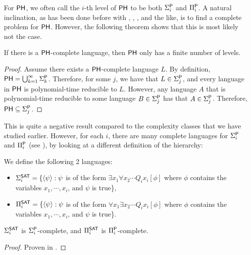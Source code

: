 For $\PH$, we often call the $i$-th level of $\PH$ to be both $\Sigma_i^\P$ and $\Pi_i^\P$. A natural inclination, as has been done before with \NP, \PSPACE, \NL, and the like, is to find a complete problem for $\PH$. However, the following theorem shows that this is most likely not the case.

\begin{theorem}
If there is a $\PH$-complete language, then $\PH$ only has a finite number of levels.
\end{theorem}

\begin{proof}
Assume there exists a $\PH$-complete language $L$. By definition, $\PH = \bigcup_{k = 1}^{\infty} \Sigma_k^\P$. Therefore, for some $j$, we have that $L \in \Sigma_j^\P$, and every language in $\PH$ is polynomial-time reducible to $L$. However, any language $A$ that is polynomial-time reducible to some language $B \in \Sigma_j^\P$ has that $A \in \Sigma_j^\P$. Therefore, $\PH \subseteq \Sigma_j^\P$.
\end{proof}

This is quite a negative result compared to the complexity classes that we have studied earlier. However, for each $i$, there are many complete languages for $\Sigma_i^\P$ and $\Pi_i^\P$ (see \cite{Schaefer_completenessin}), by looking at a different definition of the hierarchy:
\begin{definition}
We define the following 2 languages:
\begin{itemize}
\item $\Sigma_i^{\SAT} = \{\langle \psi \rangle : \psi$ is of the form $\exists x_1 \forall x_2 \cdots Q_ix_i [\phi]$ where $\phi$ contains the variables $x_1,\cdots,x_i$, and $\psi$ is true\},
\item $\Pi_i^{\SAT} = \{\langle \psi \rangle : \psi$ is of the form $\forall x_1 \exists x_2 \cdots Q_ix_i [\phi]$ where $\phi$ contains the variables $x_1,\cdots,x_i$, and $\psi$ is true\}. 
\end{itemize}
\end{definition}

\begin{theorem}
$\Sigma_i^{\SAT}$ is $\Sigma_i^\P$-complete, and $\Pi_i^{\SAT}$ is $\Pi_i^\P$-complete.
\end{theorem}

\begin{proof}
Proven in \cite{Wrathall197623}.
\end{proof}

